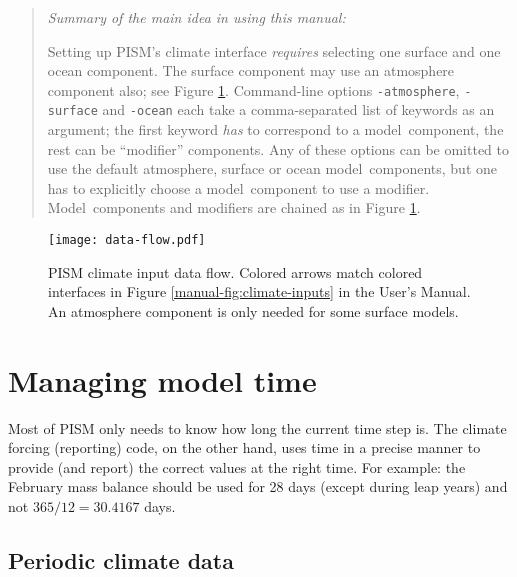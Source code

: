 \documentclass[titlepage,letterpaper,final]{scrartcl}
\begin{document}
\vspace{0.3in}

\begin{quote}
\begin{center}
\emph{Summary of the main idea in using this manual:}
\end{center}

Setting up PISM's climate interface \emph{requires} selecting one surface and one
ocean component. The surface component may use an atmosphere component also;
see Figure \ref{fig:climate-input-data-flow}. Command-line options
\texttt{-atmosphere}, \texttt{-surface} and \texttt{-ocean} each take a
comma-separated list of keywords as an argument; the first keyword \emph{has}
to correspond to a model~component, the rest can be ``modifier'' components.
Any of these options can be omitted to use the default atmosphere, surface or
ocean model~components, but one has to explicitly choose a model~component
to use a modifier. Model~components and modifiers are chained as in Figure
\ref{fig:climate-input-data-flow}.
\end{quote}

\begin{figure}
  \centering
  \texttt{[image: data-flow.pdf]}
  \caption{PISM climate input data flow.  Colored arrows match colored interfaces in
    Figure \ref*{manual-fig:climate-inputs} in the User's Manual.  An atmosphere component is only needed for some surface models.}
  \label{fig:climate-input-data-flow}
\end{figure}


\newpage
\section{Managing model time}
\label{sec:model-time}

Most of PISM only needs to know how long the current time step is. The
climate forcing (reporting) code, on the other hand, uses time in a
precise manner to provide (and report) the correct values at the right
time. For example: the February mass balance should be used for 28
days (except during leap years) and not $365/12 = 30.4167$ days.




\subsection{Periodic climate data}
\label{sec:periodic-forcing}
\end{document}
